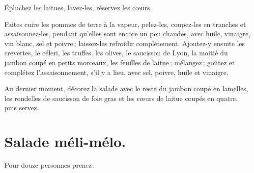 Épluchez les laitues, lavez-les, réservez les cœurs.

Faites cuire les pommes de terre à la vapeur, pelez-les, coupez-les en tranches
et assaisonnez-les, pendant qu'elles sont encore un peu chaudes, avec huile,
vinaigre, vin blanc, sel et poivre ; laissez-les refroidir complètement.
Ajoutez-y ensuite les crevettes, le céleri, les truffes. les olives, le
saucisson de Lyon, la moitié du jambon coupé en petits morceaux, les feuilles
de laitue ; mélangez ; goûtez et complétez l'assaisonnement, s'il y a lieu,
avec sel, poivre, huile et vinaigre.

Au dernier moment, décorez la salade avec le reste du jambon coupé en lamelles,
les rondelles de saucisson de foie gras et les cœurs de laitue coupés en
quatre, puis servez.

\section*{\centering Salade méli-mélo.}
{}

Pour douze personnes prenez :

